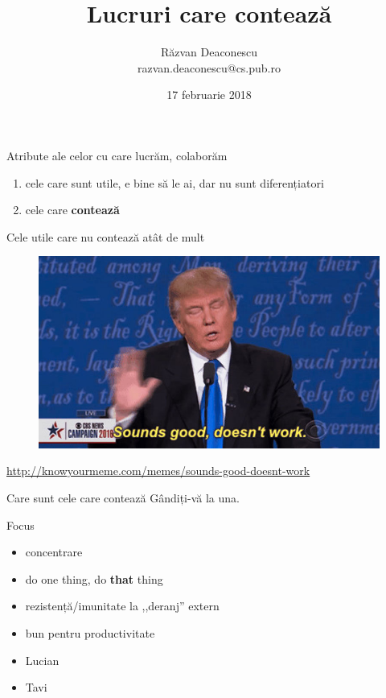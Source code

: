 \documentclass{beamer}
\title[Lucruri care contează]{Lucruri care contează}
\institute{Excursie PRECIS 708 și prietenii}
\author[Răzvan Deaconescu]{Răzvan Deaconescu \\
razvan.deaconescu@cs.pub.ro}
\date{17 februarie 2018}
\begin{document}
\frame{\titlepage}

\begin{frame}{Atribute ale celor cu care lucrăm, colaborăm}
  \begin{enumerate}
    \pause \item cele care sunt utile, e bine să le ai, dar nu sunt diferențiatori
    \pause \item cele care \textbf{contează}
  \end{enumerate}
\end{frame}

\begin{frame}{Cele utile care nu contează atât de mult}
  \begin{figure}
    \centering
    \includegraphics[width=\textwidth]{img/soundsgood.jpg}
  \end{figure}
  \begin{center}
    \scriptsize
    \url{http://knowyourmeme.com/memes/sounds-good-doesnt-work}
  \end{center}
\end{frame}

\begin{frame}{Care sunt cele care contează}
  \centering
  \pause \Large{Gândiți-vă la una.}
\end{frame}

\begin{frame}{Focus}
  \begin{itemize}
    \pause \item concentrare
    \pause \item do one thing, do \textbf{that} thing
    \pause \item rezistență/imunitate la ,,deranj'' extern
    \pause \item bun pentru productivitate
    \pause \item Lucian
    \pause \item Tavi
  \end{itemize}
\end{frame}
\end{document}
